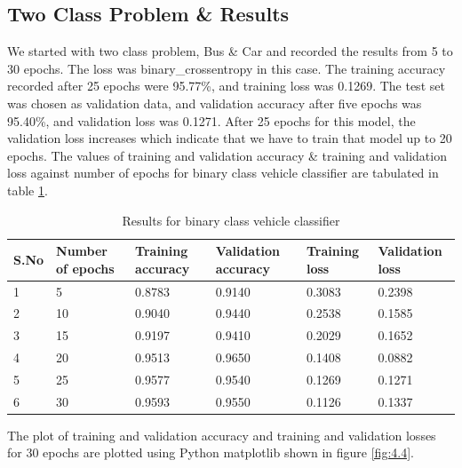 \subsection{Two Class Problem \& Results}
We started with two class problem, Bus \& Car and recorded the results from 5
to 30 epochs.
The loss was binary\_crossentropy in this case. 
The training accuracy recorded after 25 epochs were 95.77\%, and training
loss was 0.1269. The test set was chosen as validation data, and validation accuracy after five epochs was 95.40\%, and validation loss was 0.1271.
After 25 epochs for this model, the validation loss increases which indicate
that we have to train that model up to 20 epochs. The values of training
and validation accuracy \& training and validation loss
against number of epochs for binary class vehicle classifier
are tabulated in table \ref{table:4.1}.
\begin{table}[H]
    \caption{Results for binary class vehicle classifier}
    \label{table:4.1}
      \begin{center}
        \scalebox{0.85}
        {\begin{tabular}{|l |l |l |l |l |l |}
        \hline
        S.No & Number of epochs & Training accuracy & Validation accuracy & Training loss & Validation loss\\ \hline
        1  & 5 & 0.8783 & 0.9140 & 0.3083 & 0.2398
        \\ \hline
        2  & 10 & 0.9040 & 0.9440 & 0.2538 & 0.1585 
        \\ \hline
        3   & 15 & 0.9197  &  0.9410 & 0.2029 & 0.1652
        \\ \hline %
        4   & 20 &  0.9513 & 0.9650  &0.1408  & 0.0882
        \\ \hline %
        5   & 25 &  0.9577 & 0.9540  &0.1269  & 0.1271
        \\ \hline %
        6   & 30 &  0.9593 & 0.9550  &0.1126  & 0.1337
        \\ \hline %
        \end{tabular}}
      \end{center}
\end{table}
\noindent The plot of training and validation accuracy and training and validation
losses for 30 epochs are plotted using Python matplotlib shown in figure \ref{fig:4.4}.
